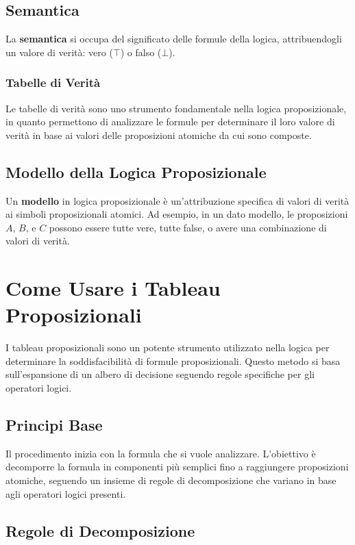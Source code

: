 \documentclass{article}
\begin{document}
\subsection{Semantica}
La \textbf{semantica} si occupa del significato delle formule della logica, attribuendogli un valore di verità: vero ($\top$) o falso ($\bot$).

\subsubsection{Tabelle di Verità}
Le tabelle di verità sono uno strumento fondamentale nella logica proposizionale, in quanto permettono di analizzare le formule per determinare il loro valore di verità in base ai valori delle proposizioni atomiche da cui sono composte.

\subsection{Modello della Logica Proposizionale}
Un \textbf{modello} in logica proposizionale è un'attribuzione specifica di valori di verità ai simboli proposizionali atomici. Ad esempio, in un dato modello, le proposizioni $A$, $B$, e $C$ possono essere tutte vere, tutte false, o avere una combinazione di valori di verità.
\newpage
\section{Come Usare i Tableau Proposizionali}

I tableau proposizionali sono un potente strumento utilizzato nella logica per determinare la soddisfacibilità di formule proposizionali. Questo metodo si basa sull'espansione di un albero di decisione seguendo regole specifiche per gli operatori logici.

\subsection{Principi Base}

Il procedimento inizia con la formula che si vuole analizzare. L'obiettivo è decomporre la formula in componenti più semplici fino a raggiungere proposizioni atomiche, seguendo un insieme di regole di decomposizione che variano in base agli operatori logici presenti.

\subsection{Regole di Decomposizione}
\end{document}
